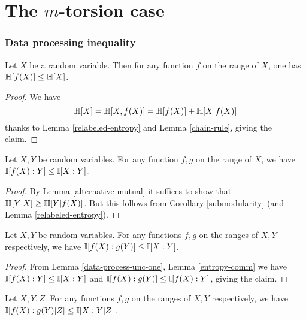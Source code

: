 \chapter{The $m$-torsion case}

\subsection{Data processing inequality}

\begin{lemma}\label{data-process-single}  Let $X$ be a random variable.  Then for any function $f$ on the range of $X$, one has $\mathbb{H}[f(X)] \leq \mathbb{H}[X]$.
\end{lemma}

\begin{proof}
We have
$$ \mathbb{H}[X] = \mathbb{H}[X,f(X)] = \mathbb{H}[f(X)] + \mathbb{H}[X|f(X)]$$
thanks to Lemma \ref{relabeled-entropy} and Lemma \ref{chain-rule}, giving the claim.
\end{proof}

\begin{lemma}\label{data-process-unc-one} Let $X,Y$ be random variables. For any function $f, g$ on the range of $X$, we have $\mathbb{I}[f(X) : Y] \leq \mathbb{I}[X:Y]$.
\end{lemma}

\begin{proof}
  By Lemma \ref{alternative-mutual} it suffices to show that $\mathbb{H}[Y|X] \geq \mathbb{H}[Y|f(X)]$. But this follows from Corollary \ref{submodularity} (and Lemma \ref{relabeled-entropy}).
\end{proof}

\begin{lemma}\label{data-process-unc} Let $X,Y$ be random variables. For any functions $f, g$ on the ranges of $X, Y$ respectively, we have $\mathbb{I}[f(X) : g(Y )] \leq \mathbb{I}[X : Y]$.
\end{lemma}

\begin{proof} From Lemma \ref{data-process-unc-one}, Lemma \ref{entropy-comm} we have $\mathbb{I}[f(X) : Y] \leq \mathbb{I}[X:Y]$ and $\mathbb{I}[f(X): g(Y)] \leq \mathbb{I}[f(X):Y]$, giving the claim.
\end{proof}

\begin{lemma}\label{data-process} Let $X,Y,Z$. For any functions $f, g$
on the ranges of $X, Y$ respectively, we have $\mathbb{I}[f(X) : g(Y )|Z] \leq \mathbb{I}[X :Y |Z]$.
\end{lemma}

